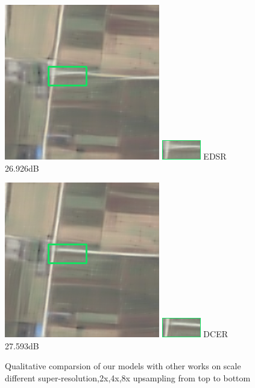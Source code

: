 \documentclass[runningheads,a4paper]{llncs}
\begin{document}
\begin{figure}[htbp]
\begin{minipage}{1.4cm}
    \end{minipage}
    \qquad
    \begin{minipage}{1.4cm}
     \includegraphics[scale=0.2]{pic/8x/edsr/pick-437.png}
    \includegraphics[scale=0.8]{pic/8x/edsr/small-437.png}
    {EDSR \newline 26.926dB }
    \end{minipage}
   \qquad
    \begin{minipage}{1.3cm}
    \includegraphics[scale=0.2]{pic/8x/dcer/pick-437.png}
    \includegraphics[scale=0.8]{pic/8x/dcer/small-437.png}
    {DCER \newline 27.593dB}
    \end{minipage}

\caption{Qualitative comparsion of our models with other works on scale different super-resolution,2x,4x,8x upsampling from top to bottom}
\label{res}
\end{figure}
\end{document}
